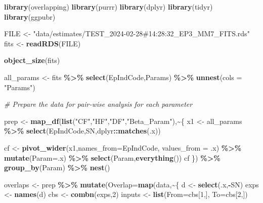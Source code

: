 \documentclass[10pt,letterpaper]{article}
\newenvironment{Shaded}{\begin{snugshade}}{\end{snugshade}}
\newcommand{\AttributeTok}[1]{\textcolor[rgb]{0.13,0.29,0.53}{#1}}
\newcommand{\CommentTok}[1]{\textcolor[rgb]{0.56,0.35,0.01}{\textit{#1}}}
\newcommand{\DecValTok}[1]{\textcolor[rgb]{0.00,0.00,0.81}{#1}}
\newcommand{\FunctionTok}[1]{\textcolor[rgb]{0.13,0.29,0.53}{\textbf{#1}}}
\newcommand{\NormalTok}[1]{#1}
\newcommand{\OtherTok}[1]{\textcolor[rgb]{0.56,0.35,0.01}{#1}}
\newcommand{\SpecialCharTok}[1]{\textcolor[rgb]{0.81,0.36,0.00}{\textbf{#1}}}
\newcommand{\StringTok}[1]{\textcolor[rgb]{0.31,0.60,0.02}{#1}}
\begin{document}
\begin{Shaded}
\begin{Highlighting}[]
\FunctionTok{library}\NormalTok{(overlapping)}
\FunctionTok{library}\NormalTok{(purrr)}
\FunctionTok{library}\NormalTok{(dplyr)}
\FunctionTok{library}\NormalTok{(tidyr)}
\FunctionTok{library}\NormalTok{(ggpubr)}

\NormalTok{FILE   }\OtherTok{\textless{}{-}} \StringTok{"data/estimates/TEST\_2024{-}02{-}28\#14:28:32\_EP3\_MM7\_FITS.rds"}
\NormalTok{fits }\OtherTok{\textless{}{-}} \FunctionTok{readRDS}\NormalTok{(FILE)}

\FunctionTok{object\_size}\NormalTok{(fits)}

\NormalTok{all\_params }\OtherTok{\textless{}{-}}\NormalTok{ fits }\SpecialCharTok{\%\textgreater{}\%}
               \FunctionTok{select}\NormalTok{(EpIndCode,Params) }\SpecialCharTok{\%\textgreater{}\%}
               \FunctionTok{unnest}\NormalTok{(}\AttributeTok{cols =} \StringTok{"Params"}\NormalTok{)}

\CommentTok{\# Prepare the data for pair{-}wise analysis for each parameter}

\NormalTok{prep }\OtherTok{\textless{}{-}} \FunctionTok{map\_df}\NormalTok{(}\FunctionTok{list}\NormalTok{(}\StringTok{"CF"}\NormalTok{,}\StringTok{"HF"}\NormalTok{,}\StringTok{"DF"}\NormalTok{,}\StringTok{"Beta\_Param"}\NormalTok{),}\SpecialCharTok{\textasciitilde{}}\NormalTok{\{}
\NormalTok{  x1 }\OtherTok{\textless{}{-}}\NormalTok{ all\_params }\SpecialCharTok{\%\textgreater{}\%}
          \FunctionTok{select}\NormalTok{(EpIndCode,SN,dplyr}\SpecialCharTok{::}\FunctionTok{matches}\NormalTok{(.x))}

\NormalTok{  cf }\OtherTok{\textless{}{-}} \FunctionTok{pivot\_wider}\NormalTok{(x1,}\AttributeTok{names\_from=}\NormalTok{EpIndCode,}
                       \AttributeTok{values\_from =}\NormalTok{ .x) }\SpecialCharTok{\%\textgreater{}\%}
        \FunctionTok{mutate}\NormalTok{(}\AttributeTok{Param=}\NormalTok{.x) }\SpecialCharTok{\%\textgreater{}\%}
        \FunctionTok{select}\NormalTok{(Param,}\FunctionTok{everything}\NormalTok{())}
\NormalTok{  cf}
\NormalTok{\}) }\SpecialCharTok{\%\textgreater{}\%} \FunctionTok{group\_by}\NormalTok{(Param) }\SpecialCharTok{\%\textgreater{}\%} \FunctionTok{nest}\NormalTok{()}

\NormalTok{overlaps }\OtherTok{\textless{}{-}}\NormalTok{ prep }\SpecialCharTok{\%\textgreater{}\%}
              \FunctionTok{mutate}\NormalTok{(}\AttributeTok{Overlap=}\FunctionTok{map}\NormalTok{(data,}\SpecialCharTok{\textasciitilde{}}\NormalTok{\{}
\NormalTok{                d }\OtherTok{\textless{}{-}} \FunctionTok{select}\NormalTok{(.x,}\SpecialCharTok{{-}}\NormalTok{SN)}
\NormalTok{                exps }\OtherTok{\textless{}{-}} \FunctionTok{names}\NormalTok{(d)}
\NormalTok{                cbs }\OtherTok{\textless{}{-}} \FunctionTok{combn}\NormalTok{(exps,}\DecValTok{2}\NormalTok{)}
\NormalTok{                inputs }\OtherTok{\textless{}{-}} \FunctionTok{list}\NormalTok{(}\AttributeTok{From=}\NormalTok{cbs[}\DecValTok{1}\NormalTok{,],}
                               \AttributeTok{To=}\NormalTok{cbs[}\DecValTok{2}\NormalTok{,])}


\end{Highlighting}
\end{Shaded}
\end{document}

